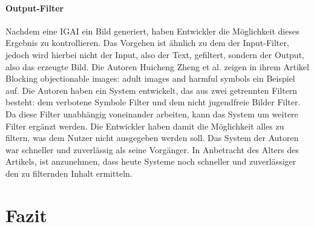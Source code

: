 \documentclass[12pt]{article}
\begin{document}
\subsubsection{Output-Filter}
Nachdem eine IGAI ein Bild generiert, haben Entwickler die Möglichkeit dieses Ergebnis zu kontrollieren. Das Vorgehen ist ähnlich zu dem der Input-Filter, jedoch wird hierbei nicht der Input, also der Text, gefiltert, sondern der Output, also das erzeugte Bild. Die Autoren Huicheng Zheng et al. zeigen in ihrem Artikel Blocking objectionable images: adult images and harmful symbols ein Beispiel auf. Die Autoren haben ein System entwickelt, das aus zwei getrennten Filtern besteht: dem verbotene Symbole Filter und dem nicht jugendfreie Bilder Filter. Da diese Filter unabhängig voneinander arbeiten, kann das System um weitere Filter ergänzt werden. Die Entwickler haben damit die Möglichkeit alles zu filtern, was dem Nutzer nicht ausgegeben werden soll. Das System der Autoren war schneller und zuverlässig als seine Vorgänger. In Anbetracht des Alters des Artikels, ist anzunehmen, dass heute Systeme noch schneller und zuverlässiger den zu filternden Inhalt ermitteln.

\chapter{Fazit}


\end{document}
